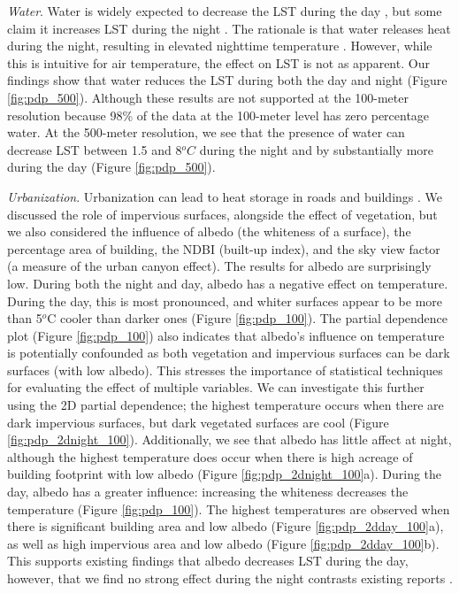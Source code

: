 \documentclass[final,3p,times,twocolumn,sort&compress]{elsarticle}
\begin{document}
\textit{Water}.
Water is widely expected to decrease the LST during the day \cite{Wicki2017-fv, Zhou2018-iy, Wang2019-water}, but some claim it increases LST during the night \cite{Chun2017-mm}.
The rationale is that water releases heat during the night, resulting in elevated nighttime temperature \cite{Chun2017-mm}.
However, while this is intuitive for air temperature, the effect on LST is not as apparent.
Our findings show that water reduces the LST during both the day and night (Figure \ref{fig:pdp_500}).
Although these results are not supported at the 100-meter resolution because 98\% of the data at the 100-meter level has zero percentage water.
At the 500-meter resolution, we see that the presence of water can decrease LST between 1.5 and 8$^oC$ during the night and by substantially more during the day (Figure \ref{fig:pdp_500}).

\textit{Urbanization}.
Urbanization can lead to heat storage in roads and buildings \cite{Zhou2014-wc, Voogt2003-mm}. 
We discussed the role of impervious surfaces, alongside the effect of vegetation, but we also considered the influence of albedo (the whiteness of a surface), the percentage area of building, the NDBI (built-up index), and the sky view factor (a measure of the urban canyon effect).
The results for albedo are surprisingly low.
During both the night and day, albedo has a negative effect on temperature.
During the day, this is most pronounced, and whiter surfaces appear to be more than 5$^o$C cooler than darker ones (Figure \ref{fig:pdp_100}).
The partial dependence plot (Figure \ref{fig:pdp_100}) also indicates that albedo's influence on temperature is potentially confounded as both vegetation and impervious surfaces can be dark surfaces (with low albedo).
This stresses the importance of statistical techniques for evaluating the effect of multiple variables.
We can investigate this further using the 2D partial dependence; the highest temperature occurs when there are dark impervious surfaces, but dark vegetated surfaces are cool (Figure \ref{fig:pdp_2dnight_100}).
Additionally, we see that albedo has little affect at night, although the highest temperature does occur when there is high acreage of building footprint with low albedo (Figure \ref{fig:pdp_2dnight_100}a).
During the day, albedo has a greater influence: increasing the whiteness decreases the temperature (Figure \ref{fig:pdp_100}).
The highest temperatures are observed when there is significant building area and low albedo (Figure \ref{fig:pdp_2dday_100}a), as well as high impervious area and low albedo (Figure \ref{fig:pdp_2dday_100}b).
This supports existing findings that albedo decreases LST during the day, however, that we find no strong effect during the night contrasts existing reports \cite{Peng2012-iy, Zhou2014-wc}.
\end{document}
